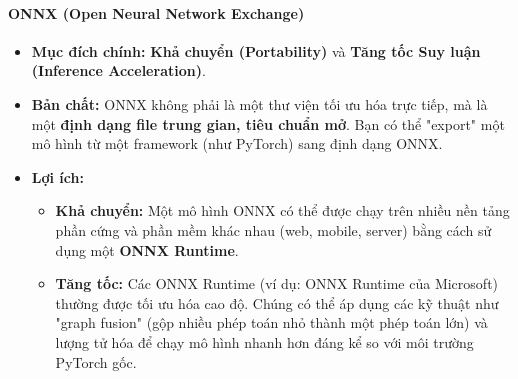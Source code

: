 \paragraph{ONNX (Open Neural Network Exchange)}
\begin{itemize}
    \item \textbf{Mục đích chính:} \textbf{Khả chuyển (Portability)} và \textbf{Tăng tốc Suy luận (Inference Acceleration)}.
    \item \textbf{Bản chất:} ONNX không phải là một thư viện tối ưu hóa trực tiếp, mà là một \textbf{định dạng file trung gian, tiêu chuẩn mở}. Bạn có thể "export" một mô hình từ một framework (như PyTorch) sang định dạng ONNX.
    \item \textbf{Lợi ích:}
        \begin{itemize}
            \item \textbf{Khả chuyển:} Một mô hình ONNX có thể được chạy trên nhiều nền tảng phần cứng và phần mềm khác nhau (web, mobile, server) bằng cách sử dụng một \textbf{ONNX Runtime}.
            \item \textbf{Tăng tốc:} Các ONNX Runtime (ví dụ: ONNX Runtime của Microsoft) thường được tối ưu hóa cao độ. Chúng có thể áp dụng các kỹ thuật như "graph fusion" (gộp nhiều phép toán nhỏ thành một phép toán lớn) và lượng tử hóa để chạy mô hình nhanh hơn đáng kể so với môi trường PyTorch gốc.
        \end{itemize}
\end{itemize}
